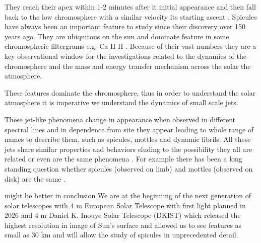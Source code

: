 \documentclass[12pt]{ociamthesis}
\newcommand{\np}{\\ \\}
\begin{document}
They reach their apex within 1-2 minutes after it initial appearance and then fall back to the low chromosphere with a similar velocity its starting ascent \citep{Tsiropoula2012}. Spicules have always been an important feature to study since their discovery over 150 years ago. They are ubiquitous on the sun and dominate feature in some chromospheric filtergrams e.g. Ca II H \cite{Pereira2016ApJ82465P}. Because of their vast numbers they are a key observational window for the investigations related to the dynamics of the chromosphere and the mass and energy transfer mechanism across the solar the atmosphere. %

These features dominate the chromosphere, thus in order to understand the solar atmosphere it is imperative we understand the dynamics of small scale jets.

These jet-like phenomena change in appearance when observed in different spectral lines and in dependence from site they appear leading to whole range of names to describe them, such as spicules, mottles and dynamic fibrils. All these jets share similar properties and behaviors eluding to the possibility they all are related or even are the same phenomena \citep{Porfir2016A}. For example there has been a long standing question whether spicules (observed on limb) and mottles (observed on disk) are the same \citep{Pontieu2007ASPC}.

{\color{green} might be better in conclusion} We are at the beginning of the next generation of solar telescopes with $4$ m European Solar Telescope with first light planned in $2026$ \citep{Matthews2016SPIE} and $4$ m Daniel K. Inouye Solar Telescope (DKIST) which released the highest resolution in image of Sun's surface and allowed us to see features as small as $30$ km and will allow the study of spicules in unprecedented detail.
\end{document}
